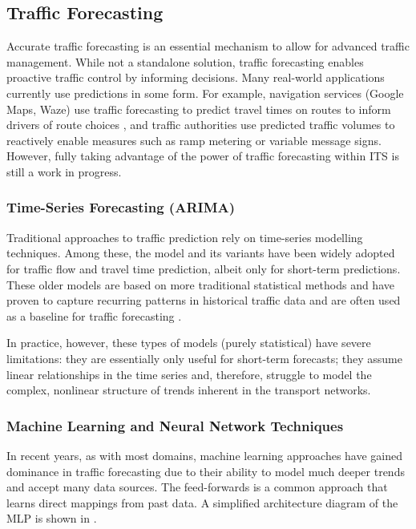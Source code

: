 \subsection{Traffic Forecasting}
Accurate traffic forecasting is an essential mechanism to allow for advanced traffic management. While not a standalone solution, traffic forecasting enables proactive traffic control by informing decisions. Many real-world applications currently use predictions in some form. For example, navigation services (Google Maps, Waze) use traffic forecasting to predict travel times on routes to inform drivers of route choices \cite{noauthor_google_2020}, and traffic authorities use predicted traffic volumes to reactively enable measures such as ramp metering or variable message signs. However, fully taking advantage of the power of traffic forecasting within ITS is still a work in progress. 

\subsubsection{Time-Series Forecasting (ARIMA)}
Traditional approaches to traffic prediction rely on time-series modelling techniques. Among these, the  model and its variants have been widely adopted for traffic flow and travel time prediction, albeit only for short-term predictions. These older models are based on more traditional statistical methods and have proven to capture recurring patterns in historical traffic data and are often used as a baseline for traffic forecasting \cite{katambire_forecasting_2023}.

In practice, however, these types of models (purely statistical) have severe limitations: they are essentially only useful for short-term forecasts; they assume linear relationships in the time series and, therefore, struggle to model the complex, nonlinear structure of trends inherent in the transport networks.

\subsubsection{Machine Learning and Neural Network Techniques}
In recent years, as with most domains, machine learning approaches have gained dominance in traffic forecasting due to their ability to model much deeper trends and accept many data sources. The feed-forwards  is a common approach that learns direct mappings from past data. A simplified architecture diagram of the MLP is shown in .

